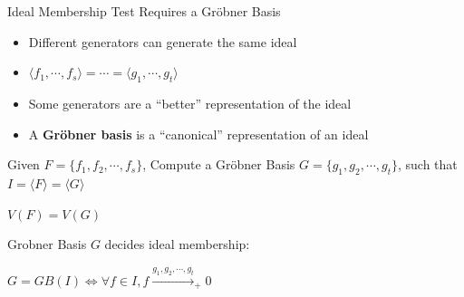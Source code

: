 \documentclass[xcolor=dvipsnames]{beamer}
\begin{document}
\begin{frame}{\large {Ideal Membership Test Requires a Gr\"obner Basis}}
\vspace{-0.2in}

\begin{itemize}
\item Different generators can generate the same ideal
\item $\langle f_1,\cdots,f_s \rangle=\cdots=\langle g_1,\cdots,g_t
  \rangle$
\item Some generators are a ``better'' representation of the ideal
\item A {\bf Gr\"obner basis} is a ``canonical'' representation of an ideal
\end{itemize}

Given $F = \{f_1, f_2,\cdots, f_s\}$, Compute a Gr\"obner Basis $G =
\{g_1,g_2,\cdots,g_t\}$, such that $I = \langle F \rangle = \langle G \rangle$

\begin{center}
$V(F)=V(G)$
\end{center}

Grobner Basis $G$ decides ideal membership:\\
\begin{center}
$G = GB(I) \iff \forall f \in I, f \stackrel{g_1, g_2, \cdots,
  g_t}{\textstyle\longrightarrow}_+0$ 
\end{center}

\end{frame}

\end{document}
